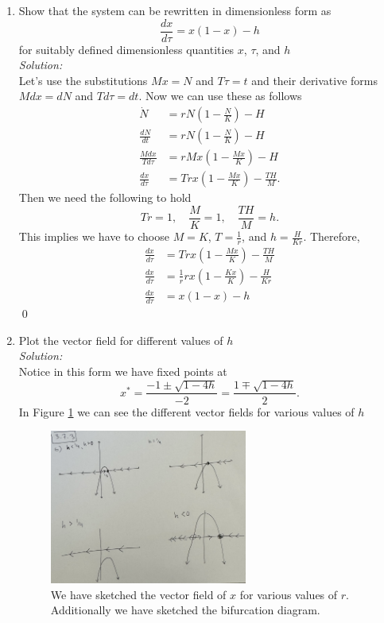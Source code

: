 \documentclass[10pt]{amsart}
\theoremstyle{nonumberplain}
\begin{document}
\begin{enumerate}[label={\bf {\arabic*}:}]
\begin{enumerate}

\item Show that the system can be rewritten in dimensionless form as 
$$
\frac {dx}{d\tau} = x(1 - x) - h
$$
for suitably defined dimensionless quantities $x$, $\tau$, and $h$ \\

\noindent
\textit{Solution:} \\
Let's use the substitutions  $Mx = N$ and $T\tau = t$ and their derivative forms $Mdx = dN$ and $Td\tau = dt$.
Now we can use these as follows
\begin{align*}
\dot N &= rN\left( 1 - \frac N K \right) - H \\
\frac {dN}{dt} &= rN\left( 1 - \frac N K \right) - H \\
\frac {Mdx}{Td\tau} &= rMx\left( 1 - \frac {Mx} K \right) - H \\
\frac {dx}{d\tau} &= T rx\left( 1 - \frac {Mx} K \right) - \frac{TH}M.
\end{align*}
Then we need the following to hold
$$Tr = 1, \quad \frac M K = 1, \quad \frac {TH} M = h.$$
This implies we have to choose $M = K$, $T = \frac 1 r$, and $h = \frac H {Kr}$.
Therefore,
\begin{align*}
\frac {dx}{d\tau} &= T rx\left( 1 - \frac {Mx} K \right) - \frac{TH}M \\
\frac {dx}{d\tau} &= \frac 1 r rx\left( 1 - \frac {Kx} K \right) - \frac H {Kr} \\
\frac {dx}{d\tau} &= x\left( 1 - x \right) - h
\end{align*}
\qed \\

\newpage

\item Plot the vector field for different values of $h$ \\

\noindent
\textit{Solution:} \\
Notice in this form we have fixed points at
$$x^* = \frac {-1 \pm \sqrt{1 - 4h}}{-2} = \frac {1 \mp \sqrt{1 - 4h}}{2}.$$
In Figure \ref{fig:f6} we can see the different vector fields for various values of $h$

\begin{figure}[h]
	\centering
	\includegraphics[height=2in]{3_7_3.png}
 	\caption{We have sketched the vector field of $x$ for various values of $r$. Additionally we have sketched the bifurcation diagram.}\label{fig:f6}
\end{figure}


\end{enumerate}
\end{enumerate}
\end{document}
